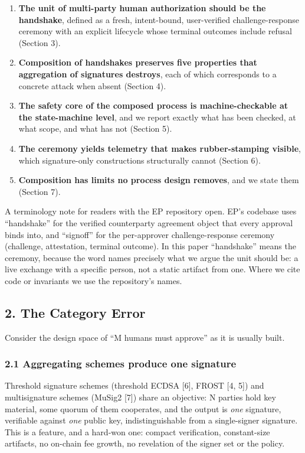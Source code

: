 \documentclass[
  11pt,
]{article}
\providecommand{\tightlist}{%
  \setlength{\itemsep}{0pt}\setlength{\parskip}{0pt}}
\begin{document}
\begin{enumerate}
\def\labelenumi{\arabic{enumi}.}
\tightlist
\item
  \textbf{The unit of multi-party human authorization should be the
  handshake}, defined as a fresh, intent-bound, user-verified
  challenge-response ceremony with an explicit lifecycle whose terminal
  outcomes include refusal (Section 3).
\item
  \textbf{Composition of handshakes preserves five properties that
  aggregation of signatures destroys}, each of which corresponds to a
  concrete attack when absent (Section 4).
\item
  \textbf{The safety core of the composed process is machine-checkable
  at the state-machine level}, and we report exactly what has been
  checked, at what scope, and what has not (Section 5).
\item
  \textbf{The ceremony yields telemetry that makes rubber-stamping
  visible}, which signature-only constructions structurally cannot
  (Section 6).
\item
  \textbf{Composition has limits no process design removes}, and we
  state them (Section 7).
\end{enumerate}

A terminology note for readers with the EP repository open. EP's
codebase uses ``handshake'' for the verified counterparty agreement
object that every approval binds into, and ``signoff'' for the
per-approver challenge-response ceremony (challenge, attestation,
terminal outcome). In this paper ``handshake'' means the ceremony,
because the word names precisely what we argue the unit should be: a
live exchange with a specific person, not a static artifact from one.
Where we cite code or invariants we use the repository's names.

\subsection{2. The Category Error}\label{the-category-error}

Consider the design space of ``M humans must approve'' as it is usually
built.

\subsubsection{2.1 Aggregating schemes produce one
signature}\label{aggregating-schemes}

Threshold signature schemes (threshold ECDSA {[}6{]}, FROST {[}4, 5{]})
and multisignature schemes (MuSig2 {[}7{]}) share an objective: N
parties hold key material, some quorum of them cooperates, and the
output is \emph{one} signature, verifiable against \emph{one} public
key, indistinguishable from a single-signer signature. This is a
feature, and a hard-won one: compact verification, constant-size
artifacts, no on-chain fee growth, no revelation of the signer set or
the policy.
\end{document}
